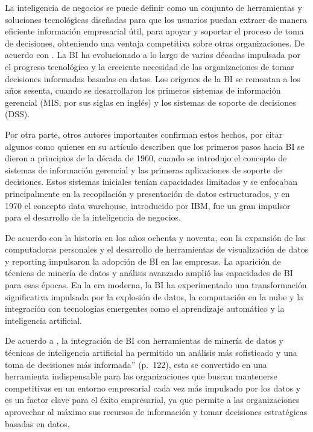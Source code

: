\documentclass[
  11pt,
  bookmarksnumbered]{article}
\begin{document}
La inteligencia de negocios se puede definir como un conjunto de herramientas y soluciones tecnológicas diseñadas para que los usuarios puedan extraer de manera eficiente información empresarial útil, para apoyar y soportar el proceso de toma de decisiones, obteniendo una ventaja competitiva sobre otras organizaciones.
De acuerdo con \textcite{xu2007research}.
La BI ha evolucionado a lo largo de varias décadas impulsada por el progreso tecnológico y la creciente necesidad de las organizaciones de tomar decisiones informadas basadas en datos.
Los orígenes de la BI se remontan a los años sesenta, cuando se desarrollaron los primeros sistemas de información gerencial (MIS, por sus siglas en inglés) y los sistemas de soporte de decisiones (DSS).

Por otra parte, otros autores importantes confirman estos hechos, por citar algunos como \textcite{tutunea2012business} quienes en su artículo describen que los primeros pasos hacia BI se dieron a principios de la década de 1960, cuando se introdujo el concepto de sistemas de información gerencial y las primeras aplicaciones de soporte de decisiones.
Estos sistemas iniciales tenían capacidades limitadas y se enfocaban principalmente en la recopilación y presentación de datos estructurados, y en 1970 el concepto data warehouse, introducido por IBM, fue un gran impulsor para el desarrollo de la inteligencia de negocios.

De acuerdo con la historia en los años ochenta y noventa, con la expansión de las computadoras personales y el desarrollo de herramientas de visualización de datos y reporting impulsaron la adopción de BI en las empresas.
La aparición de técnicas de minería de datos y análisis avanzado amplió las capacidades de BI para esas épocas.
En la era moderna, la BI ha experimentado una transformación significativa impulsada por la explosión de datos, la computación en la nube y la integración con tecnologías emergentes como el aprendizaje automático y la inteligencia artificial.

De acuerdo a \textcite{jourdan2008business}, la integración de BI con herramientas de minería de datos y técnicas de inteligencia artificial ha permitido un análisis más sofisticado y una toma de decisiones más informada'' (p.~122), esta se convertido en una herramienta indispensable para las organizaciones que buscan mantenerse competitivas en un entorno empresarial cada vez más impulsado por los datos y es un factor clave para el éxito empresarial, ya que permite a las organizaciones aprovechar al máximo sus recursos de información y tomar decisiones estratégicas basadas en datos.
\end{document}

